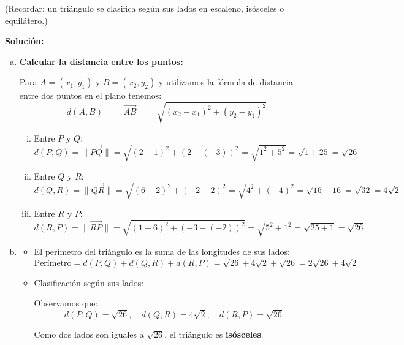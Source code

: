 \documentclass[11pt,a4paper]{article}
\begin{document}
\begin{enumerate}[\hspace{-5mm} 1) ]
\begin{flushright}
\small (Recordar: un triángulo se clasifica según sus lados en escaleno, isósceles o equilátero.)
\end{flushright}
 

{\bf Solución:}


\begin{enumerate}[a)]
    \item \textbf{Calcular la distancia entre los puntos:}
    
    Para $A=(x_1,y_1)$ y $B=(x_2,y_2)$ y utilizamos la fórmula de distancia entre dos puntos en el plano tenemos:
    \[
    d(A, B) = \| \overrightarrow{AB}\| = \sqrt{(x_2 - x_1)^2 + (y_2 - y_1)^2}
    \]

    \begin{enumerate}[i)]
        \item Entre $P$ y $Q$:
        \[
        d(P, Q)  = \| \overrightarrow{PQ}\| = \sqrt{(2 - 1)^2 + (2 - (-3))^2} = \sqrt{1^2 + 5^2} = \sqrt{1 + 25} = \sqrt{26}
        \]

        \item Entre $Q$ y $R$:
        \[
        d(Q, R)  = \| \overrightarrow{QR}\| = \sqrt{(6 - 2)^2 + (-2 - 2)^2} = \sqrt{4^2 + (-4)^2} = \sqrt{16 + 16} = \sqrt{32} = 4\sqrt{2}
        \]

        \item Entre $R$ y $P$:
        \[
        d(R, P)  = \| \overrightarrow{RP}\| = \sqrt{(1-6)^2 + (-3- (-2))^2} = \sqrt{5^2 + 1^2} = \sqrt{25 + 1} = \sqrt{26}
        \]
    \end{enumerate}

    \item  \begin{itemize}
        \item El perímetro del triángulo es la suma de las longitudes de sus lados:
        \[
        \text{Perímetro} = d(P, Q) + d(Q, R) + d(R, P) = \sqrt{26} + 4\sqrt{2} + \sqrt{26} = 2\sqrt{26} + 4\sqrt{2}
        \]

        \item Clasificación según sus lados:

        Observamos que:
        \[
        d(P, Q) = \sqrt{26}, \quad d(Q, R) = 4\sqrt{2}, \quad d(R, P) = \sqrt{26}
        \]

        Como dos lados son iguales a $\sqrt{26}$, el triángulo es \textbf{isósceles}.
    \end{itemize}
\end{enumerate}






\end{enumerate}
\end{document}
